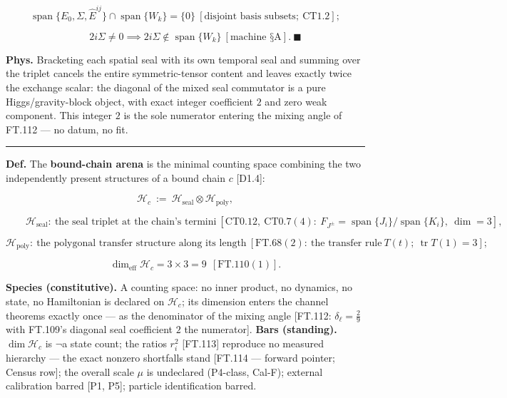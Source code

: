 \begin{theorem}
\[
\operatorname{span}\{E_0,\Sigma,\hat E^{ij}\}\cap\operatorname{span}\{W_k\}=\{0\}\ [\text{disjoint basis subsets};\ \mathrm{CT1.2}];
\]

\[
\qquad 2i\Sigma\ne0\implies 2i\Sigma\notin\operatorname{span}\{W_k\}\ [\text{machine §A}].\ \blacksquare
\]

\textbf{Phys.} Bracketing each spatial seal with its own temporal seal and summing over the triplet cancels the entire symmetric-tensor content and leaves exactly twice the exchange scalar: the diagonal of the mixed seal commutator is a pure Higgs/gravity-block object, with exact integer coefficient $2$ and zero weak component. This integer $2$ is the sole numerator entering the mixing angle of FT.112 — no datum, no fit.

\vspace{2pt}\noindent\rule{\textwidth}{0.4pt}\vspace{2pt}

\end{theorem}

\begin{definition}\label{tag:Def-H-41}
\textbf{Def.} The \textbf{bound-chain arena} is the minimal counting space combining the two independently present structures of a bound chain $c$ [D1.4]:

\[
\mathcal H_c\ :=\ \mathcal H_{\mathrm{seal}}\otimes\mathcal H_{\mathrm{poly}},
\]

\[
\qquad \mathcal H_{\mathrm{seal}}:\ \text{the seal triplet at the chain's termini}\ [\mathrm{CT0.12},\ \mathrm{CT0.7}(4):\ F_{J^\pm}=\operatorname{span}\{J_i\}/\operatorname{span}\{K_i\},\ \dim=3],
\]

\[
\mathcal H_{\mathrm{poly}}:\ \text{the polygonal transfer structure along its length}\ [\mathrm{FT.68}(2):\ \text{the transfer rule}\ T(t);\ \operatorname{tr}T(1)=3];
\]

\[
\qquad \dim_{\mathrm{eff}}\mathcal H_c=3\times3=9\ \ [\mathrm{FT.110}(1)].
\]

\textbf{Species (constitutive).} A counting space: no inner product, no dynamics, no state, no Hamiltonian is declared on $\mathcal H_c$; its dimension enters the channel theorems exactly once — as the denominator of the mixing angle [FT.112: $\delta_\ell=\tfrac29$ with FT.109's diagonal seal coefficient $2$ the numerator]. \textbf{Bars (standing).} $\dim\mathcal H_c$ is $\neg$a state count; the ratios $r_i^2$ [FT.113] reproduce no measured hierarchy — the exact nonzero shortfalls stand [FT.114 — forward pointer; Census row]; the overall scale $\mu$ is undeclared (P4-class, Cal-F); external calibration barred [P1, P5]; particle identification barred.

\end{definition}

